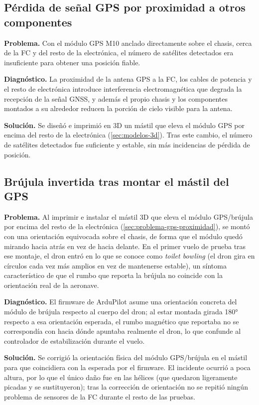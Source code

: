 \subsection{Pérdida de señal GPS por proximidad a otros componentes}
\label{sec:problema-gps-proximidad}

\textbf{Problema.} Con el módulo GPS M10 anclado directamente sobre el chasis, cerca de la FC y del resto de la electrónica, el número de satélites detectados era insuficiente para obtener una posición fiable.

\textbf{Diagnóstico.} La proximidad de la antena GPS a la FC, los cables de potencia y el resto de electrónica introduce interferencia electromagnética que degrada la recepción de la señal GNSS, y además el propio chasis y los componentes montados a su alrededor reducen la porción de cielo visible para la antena.

\textbf{Solución.} Se diseñó e imprimió en 3D un mástil que eleva el módulo GPS por encima del resto de la electrónica (\autoref{sec:modelos-3d}). Tras este cambio, el número de satélites detectados fue suficiente y estable, sin más incidencias de pérdida de posición.

\subsection{Brújula invertida tras montar el mástil del GPS}
\label{sec:problema-brujula-invertida}

\textbf{Problema.} Al imprimir e instalar el mástil 3D que eleva el módulo GPS/brújula por encima del resto de la electrónica (\autoref{sec:problema-gps-proximidad}), se montó con una orientación equivocada sobre el chasis, de forma que el módulo quedó mirando hacia atrás en vez de hacia delante. En el primer vuelo de prueba tras ese montaje, el dron entró en lo que se conoce como \textit{toilet bowling} (el dron gira en círculos cada vez más amplios en vez de mantenerse estable), un síntoma característico de que el rumbo que reporta la brújula no coincide con la orientación real de la aeronave.

\textbf{Diagnóstico.} El firmware de ArduPilot asume una orientación concreta del módulo de brújula respecto al cuerpo del dron; al estar montada girada 180° respecto a esa orientación esperada, el rumbo magnético que reportaba no se correspondía con hacia dónde apuntaba realmente el dron, lo que confunde al controlador de estabilización durante el vuelo.

\textbf{Solución.} Se corrigió la orientación física del módulo GPS/brújula en el mástil para que coincidiera con la esperada por el firmware. El incidente ocurrió a poca altura, por lo que el único daño fue en las hélices (que quedaron ligeramente picadas y se sustituyeron); tras la corrección de orientación no se repitió ningún problema de sensores de la FC durante el resto de las pruebas.

